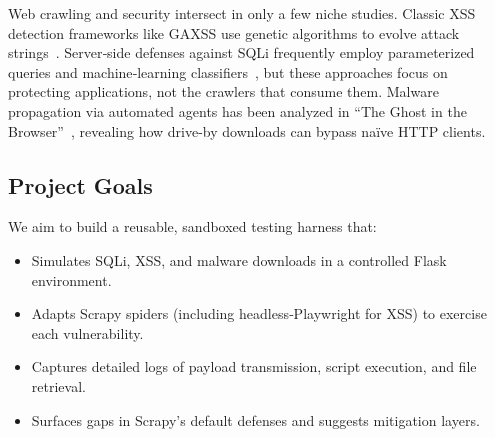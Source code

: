 



Web crawling and security intersect in only a few niche studies. Classic XSS detection frameworks like GAXSS use genetic algorithms to evolve attack strings~\cite{dong2023behind}. Server‐side defenses against SQLi frequently employ parameterized queries and machine‐learning classifiers~\cite{least-weird-forum-user}, but these approaches focus on protecting applications, not the crawlers that consume them. Malware propagation via automated agents has been analyzed in “The Ghost in the Browser”~\cite{gupta2021ghost}, revealing how drive-by downloads can bypass naïve HTTP clients.

\subsection{Project Goals}
We aim to build a reusable, sandboxed testing harness that:
\begin{itemize}
  \item Simulates SQLi, XSS, and malware downloads in a controlled Flask environment.
  \item Adapts Scrapy spiders (including headless‐Playwright for XSS) to exercise each vulnerability.
  \item Captures detailed logs of payload transmission, script execution, and file retrieval.
  \item Surfaces gaps in Scrapy’s default defenses and suggests mitigation layers.
\end{itemize}
